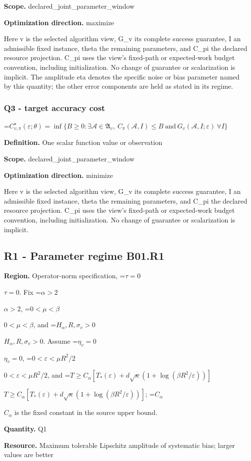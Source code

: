 \documentclass[10pt,a4paper]{article}
\newcommand{\AtlasMath}[1]{\par\begingroup\centering\setbox0=\hbox{$\displaystyle #1$}\ifdim\wd0>1.4\linewidth\typeout{ATLAS WIDE FORMULA: \the\wd0}\fi\ifdim\wd0>\linewidth\resizebox{\linewidth}{!}{\box0}\else\box0\fi\par\endgroup}
\newcommand{\AtlasInlineMath}[1]{\begingroup\setbox0=\hbox{$#1$}\ifdim\wd0>.4\linewidth\endgroup\AtlasMath{#1}\else\endgroup$#1$\fi}
\begin{document}
\textbf{Scope.} declared\_joint\_parameter\_window

\textbf{Optimization direction.} maximize

Here v is the selected algorithm view, G\_v its complete success guarantee, I an admissible fixed instance, theta the remaining parameters, and C\_pi the declared resource projection. C\_pi uses the view's fixed-path or expected-work budget convention, including initialization. No change of guarantee or scalarization is implicit. The amplitude eta denotes the specific noise or bias parameter named by this quantity; the other error components are held as stated in its regime.

\subsubsection{Q3 - target accuracy cost}
\AtlasMath{C^\star_{v,\pi}(\varepsilon;\theta)=\inf\{B\ge0:\exists\mathcal A\in\mathfrak A_v,\ C_\pi(\mathcal A,I)\le B\ \text{and}\ G_v(\mathcal A,I;\varepsilon)\ \forall I\}}
\textbf{Definition.} One scalar function value or observation

\textbf{Scope.} declared\_joint\_parameter\_window

\textbf{Optimization direction.} minimize

Here v is the selected algorithm view, G\_v its complete success guarantee, I an admissible fixed instance, theta the remaining parameters, and C\_pi the declared resource projection. C\_pi uses the view's fixed-path or expected-work budget convention, including initialization. No change of guarantee or scalarization is implicit.

\subsection{R1 - Parameter regime B01.R1}
\textbf{Region.} Operator-norm specification, \AtlasInlineMath{\tau=0}. Fix \AtlasInlineMath{\alpha>2}, \AtlasInlineMath{0<\mu<\beta}, and \AtlasInlineMath{H_\alpha,R,\sigma_v>0}. Assume \AtlasInlineMath{\eta_v=0}, \AtlasInlineMath{0<\varepsilon<\mu R^2/2}, and \AtlasInlineMath{T\ge C_\alpha[T_*(\varepsilon)+d\sqrt\kappa(1+\log(\beta R^2/\varepsilon))]}; \AtlasInlineMath{C_\alpha} is the fixed constant in the source upper bound.

\textbf{Quantity.} Q1

\textbf{Resource.} Maximum tolerable Lipschitz amplitude of systematic bias; larger values are better
\end{document}
